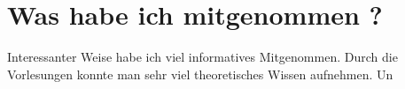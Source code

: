\chapter{Was habe ich mitgenommen ? }

Interessanter Weise habe ich viel informatives Mitgenommen. Durch die Vorlesungen konnte man sehr viel theoretisches Wissen aufnehmen. Un	